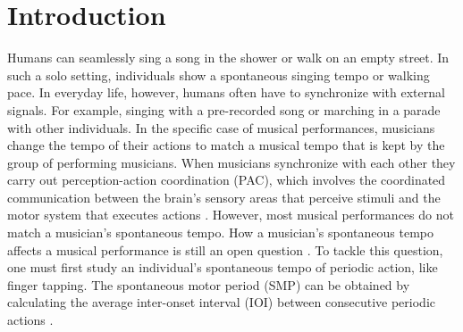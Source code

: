 \documentclass{report}
\begin{document}
\section{Introduction}
Humans can seamlessly sing a song in the shower or walk on an empty street. In such a solo setting, individuals show a spontaneous singing tempo or walking pace. In everyday life, however, humans often have to synchronize with external signals. For example, singing with a pre-recorded song or marching in a parade with other individuals. In the specific case of musical performances, musicians change the tempo of their actions to match a musical tempo that is kept by the group of performing musicians. When musicians synchronize with each other they carry out perception-action coordination (PAC), which involves the coordinated communication between the brain's sensory areas that perceive stimuli and the motor system that executes actions \cite{ridderinkhof2014neurocognitive}. However, most musical performances do not match a musician's spontaneous tempo. How a musician's spontaneous tempo affects a musical performance is still an open question \cite{zamm2018musicians}. To tackle this question, one must first study an individual's spontaneous tempo of periodic action, like finger tapping. The spontaneous motor period (SMP) can be obtained by calculating the average inter-onset interval (IOI) between consecutive periodic actions \cite{mcauley2006time}.
\end{document}
